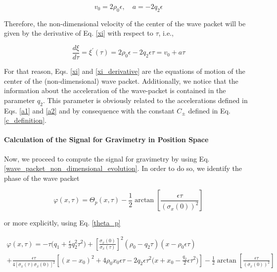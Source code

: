 \documentclass{article}
\begin{document}
\begin{equation}\label{xi_defs_eq_motion}
v_{0} = 2\rho_{0} \epsilon \mathrm{,}\quad a = -2 q_{2} \epsilon
\end{equation}

Therefore, the non-dimensional velocity of the center of the wave packet will be given by the derivative of Eq. \ref{xi} with respect to $\tau$, i.e.,

\begin{equation}\label{xi_derivative}
\frac{d\xi}{d\tau} = \xi^{\prime}(\tau) =  2 \rho_{0} \epsilon - 2 q_{2}\epsilon \tau = v_{0} + a \tau
\end{equation}

For that reason, Eqs. \ref{xi} and \ref{xi_derivative} are the equations of motion of the center of the (non-dimensional) wave packet. Additionally, we notice that the information about the acceleration of the wave-packet is contained in the parameter $q_{2}$. This parameter is obviously related to the accelerations defined in Eqs. \ref{a1} and \ref{a2} and by consequence with the constant $C_{\pm}$ defined in Eq. \ref{c_definition}.

\paragraph{Calculation of the Signal for Gravimetry in Position Space}

Now, we proceed to compute the signal for gravimetry by using Eq. \ref{wave_packet_non_dimensional_evolution}. In order to do so, we identify the phase of the wave packet

\begin{equation}
\varphi(x, \tau) = \Theta_{p}(x, \tau) - \frac{1}{2}\arctan\left[\frac{\epsilon \tau}{(\sigma_{x}(0))^{2}}\right]
\end{equation}

or more explicitly, using Eq. \ref{theta_p}

\begin{multline}\label{quantum_phase}
\varphi(x, \tau) = -\tau \bigg(q_{1} + \frac{\epsilon}{3} q_{2}^{2} \tau^{2}\bigg) + \left[\frac{\sigma_{x}(0)}{\sigma_{x}(\tau)} \right]^{2} (\rho_{0} - q_{2} \tau)(x-\rho_{0} \epsilon \tau) \\
+ \frac{\epsilon \tau}{4 [\sigma_{x}(\tau)\sigma_{x}(0)]^{2}} \left[(x-x_{0})^{2} + 4\rho_{0} x_{0} \epsilon \tau -2q_{2} \epsilon \tau^{2} \bigg(x+x_{0}- \frac{q_{2}}{2} \epsilon \tau^{2} \bigg)\right] 
- \frac{1}{2}\arctan\left[\frac{\epsilon \tau}{(\sigma_{x}(0))^{2}}\right]
\end{multline}
\end{document}
